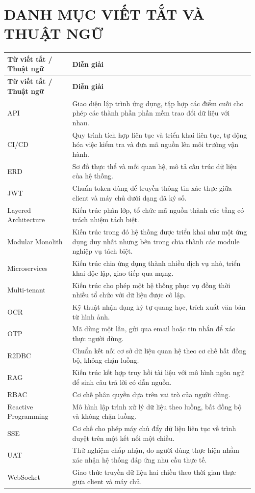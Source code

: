 \documentclass[12pt,a4paper,oneside]{report}
\begin{document}
\chapter*{DANH MỤC VIẾT TẮT VÀ THUẬT NGỮ}

\renewcommand{\arraystretch}{1.3}
\begin{longtable}{|>{\raggedright\arraybackslash}p{3.2cm}|>{\raggedright\arraybackslash}p{11.3cm}|}
\hline
\textbf{Từ viết tắt / Thuật ngữ} & \textbf{Diễn giải} \\ \hline
\endfirsthead
\hline
\textbf{Từ viết tắt / Thuật ngữ} & \textbf{Diễn giải} \\ \hline
\endhead
API & Giao diện lập trình ứng dụng, tập hợp các điểm cuối cho phép các thành phần phần mềm trao đổi dữ liệu với nhau. \\ \hline
CI/CD & Quy trình tích hợp liên tục và triển khai liên tục, tự động hóa việc kiểm tra và đưa mã nguồn lên môi trường vận hành. \\ \hline
ERD & Sơ đồ thực thể và mối quan hệ, mô tả cấu trúc dữ liệu của hệ thống. \\ \hline
JWT & Chuẩn token dùng để truyền thông tin xác thực giữa client và máy chủ dưới dạng đã ký số. \\ \hline
Layered Architecture & Kiến trúc phân lớp, tổ chức mã nguồn thành các tầng có trách nhiệm tách biệt. \\ \hline
Modular Monolith & Kiến trúc trong đó hệ thống được triển khai như một ứng dụng duy nhất nhưng bên trong chia thành các module nghiệp vụ tách biệt. \\ \hline
Microservices & Kiến trúc chia ứng dụng thành nhiều dịch vụ nhỏ, triển khai độc lập, giao tiếp qua mạng. \\ \hline
Multi-tenant & Kiến trúc cho phép một hệ thống phục vụ đồng thời nhiều tổ chức với dữ liệu được cô lập. \\ \hline
OCR & Kỹ thuật nhận dạng ký tự quang học, trích xuất văn bản từ hình ảnh. \\ \hline
OTP & Mã dùng một lần, gửi qua email hoặc tin nhắn để xác thực người dùng. \\ \hline
R2DBC & Chuẩn kết nối cơ sở dữ liệu quan hệ theo cơ chế bất đồng bộ, không chặn luồng. \\ \hline
RAG & Kiến trúc kết hợp truy hồi tài liệu với mô hình ngôn ngữ để sinh câu trả lời có dẫn nguồn. \\ \hline
RBAC & Cơ chế phân quyền dựa trên vai trò của người dùng. \\ \hline
Reactive Programming & Mô hình lập trình xử lý dữ liệu theo luồng, bất đồng bộ và không chặn luồng. \\ \hline
SSE & Cơ chế cho phép máy chủ đẩy dữ liệu liên tục về trình duyệt trên một kết nối một chiều. \\ \hline
UAT & Thử nghiệm chấp nhận, do người dùng thực hiện nhằm xác nhận hệ thống đáp ứng nhu cầu thực tế. \\ \hline
WebSocket & Giao thức truyền dữ liệu hai chiều theo thời gian thực giữa client và máy chủ. \\ \hline
\end{longtable}
\renewcommand{\arraystretch}{1}
\end{document}
